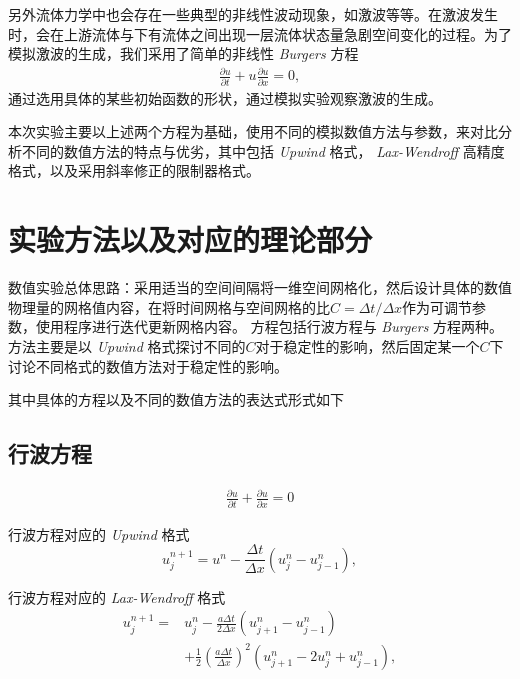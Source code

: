 \documentclass[10.5pt
]{article}
\begin{document}
另外流体力学中也会存在一些典型的非线性波动现象，如激波等等。在激波发生时，会在上游流体与下有流体之间出现一层流体状态量急剧空间变化的过程。为了模拟激波的生成，我们采用了简单的非线性 \textit{Burgers} 方程
\begin{align}
\frac{\partial u}{\partial t} + u \frac{\partial u}{\partial x} = 0, \label{EqnBurgers}
\end{align}
通过选用具体的某些初始函数的形状，通过模拟实验观察激波的生成。

本次实验主要以上述两个方程为基础，使用不同的模拟数值方法与参数，来对比分析不同的数值方法的特点与优劣，其中包括 \textit{Upwind} 格式， \textit{Lax-Wendroff} 高精度格式，以及采用斜率修正的限制器格式。

\section{实验方法以及对应的理论部分}
数值实验总体思路：采用适当的空间间隔将一维空间网格化，然后设计具体的数值物理量的网格值内容，在将时间网格与空间网格的比$C = \Delta t / \Delta x$作为可调节参数，使用程序进行迭代更新网格内容。
方程包括行波方程与 \textit{Burgers} 方程两种。方法主要是以 \textit{Upwind} 格式探讨不同的$C$对于稳定性的影响，然后固定某一个$C$下讨论不同格式的数值方法对于稳定性的影响。

其中具体的方程以及不同的数值方法的表达式形式如下

\subsection{行波方程}
\begin{align}
\frac{\partial u}{\partial t} + \frac{\partial u}{\partial x} = 0
\end{align}

行波方程对应的 \textit{Upwind} 格式\cite{he_volume-preserving_2015}
\begin{equation}
u_j^{n+1} = u^n - \frac{\Delta t}{\Delta x} (u_j^n - u_{j-1}^n), \label{EqnUpwind}
\end{equation}

行波方程对应的 \textit{Lax-Wendroff} 格式
\begin{align}
	u_j^{n+1} 
	=&
	u_j^{n} 
	-
	\frac{a \Delta t}{ 2 \Delta x } (  	u_{j+1}^{n} - u_{j-1}^{n} ) \\
	&+ \frac{1}{2} \left( \frac{a \Delta t}{ \Delta x } \right)^2 (  	u_{j+1}^{n}- 2 u_j^n + u_{j-1}^{n} ),
\end{align}
\end{document}
